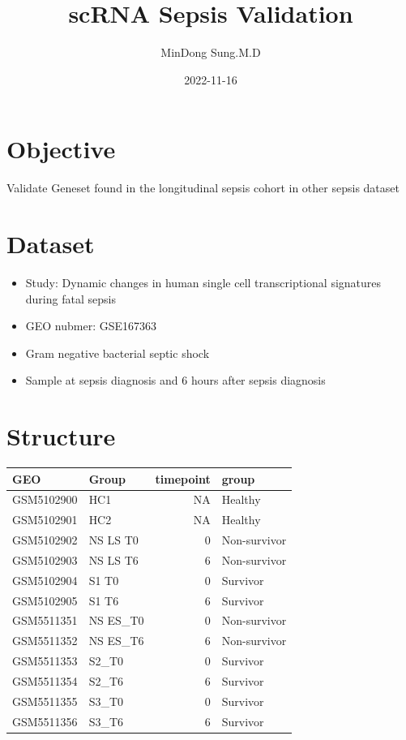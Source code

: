 \documentclass[
  12pt,
]{article}
\title{scRNA Sepsis Validation}
\author{MinDong Sung.M.D}
\date{2022-11-16}
\providecommand{\tightlist}{%
  \setlength{\itemsep}{0pt}\setlength{\parskip}{0pt}}
\begin{document}
\maketitle

\hypertarget{objective}{%
\section{Objective}\label{objective}}

Validate Geneset found in the longitudinal sepsis cohort in other sepsis
dataset

\hypertarget{dataset}{%
\section{Dataset}\label{dataset}}

\begin{itemize}
\tightlist
\item
  Study: Dynamic changes in human single cell transcriptional signatures
  during fatal sepsis
\item
  GEO nubmer: GSE167363
\item
  Gram negative bacterial septic shock
\item
  Sample at sepsis diagnosis and 6 hours after sepsis diagnosis
\end{itemize}

\hypertarget{structure}{%
\section{Structure}\label{structure}}

\begin{tabular}{llrl}
\toprule
GEO & Group & timepoint & group\\
\midrule
GSM5102900 & HC1 & NA & Healthy\\
GSM5102901 & HC2 & NA & Healthy\\
GSM5102902 & NS LS T0 & 0 & Non-survivor\\
GSM5102903 & NS LS T6 & 6 & Non-survivor\\
GSM5102904 & S1 T0 & 0 & Survivor\\
GSM5102905 & S1 T6 & 6 & Survivor\\
GSM5511351 & NS ES\_T0 & 0 & Non-survivor\\
GSM5511352 & NS ES\_T6 & 6 & Non-survivor\\
GSM5511353 & S2\_T0 & 0 & Survivor\\
GSM5511354 & S2\_T6 & 6 & Survivor\\
GSM5511355 & S3\_T0 & 0 & Survivor\\
GSM5511356 & S3\_T6 & 6 & Survivor\\
\bottomrule
\end{tabular}
\end{document}
